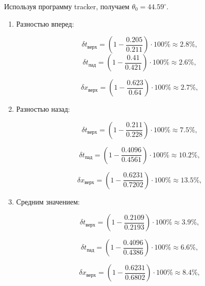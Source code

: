 \documentclass{report}
\begin{document}
Используя программу tracker, получаем $\theta_0=44.59^{\circ}$.

\begin{enumerate}
\item
Разностью вперед:

\begin{equation}
  \delta t_{\text{верх}} = \left(1 - \dfrac{0.205}{0.211}\right) \cdot 100 \% \approx 2.8\% \text{,}
\end{equation}
\begin{equation}
  \delta t_{\text{пад}} = \left(1 - \dfrac{0.41}{0.421}\right) \cdot 100 \% \approx 2.6\% \text{,}
\end{equation}

\begin{equation}
  \delta x_{\text{верх}} = \left(1 - \dfrac{0.623}{0.64}\right) \cdot 100 \% \approx 2.7\% \text{,} 
\end{equation}

\item Разностью назад:


\begin{equation}
  \delta t_{\text{верх}} = \left(1 - \dfrac{0.211}{0.228}\right) \cdot 100 \% \approx 7.5\% \text{,}
\end{equation}

\begin{equation}
  \delta t_{\text{пад}} = \left(1 - \dfrac{0.4096}{0.4561}\right) \cdot 100 \% \approx 10.2\% \text{,}
\end{equation}

\begin{equation}
  \delta x_{\text{верх}} = \left(1 - \dfrac{0.6231}{0.7202}\right) \cdot 100 \% \approx 13.5\% \text{,}
\end{equation}


\item Средним значением:

\begin{equation}
  \delta t_{\text{верх}} = \left(1 - \dfrac{0.2109}{0.2193}\right) \cdot 100 \% \approx 3.9\% \text{,}
\end{equation}

\begin{equation}
  \delta t_{\text{пад}} = \left(1 - \dfrac{0.4096}{0.4386}\right) \cdot 100 \% \approx 6.6\% \text{,}
\end{equation}

\begin{equation}
  \delta x_{\text{верх}} = \left(1 - \dfrac{0.6231}{0.6802}\right) \cdot 100 \% \approx 8.4\% \text{,}
\end{equation}


\end{enumerate}
\end{document}
